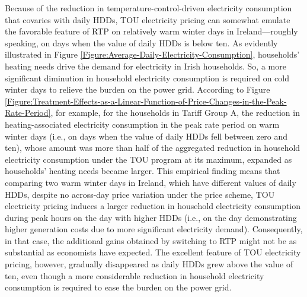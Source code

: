 Because of the reduction in temperature-control-driven electricity consumption that covaries with daily HDDs, TOU electricity pricing can somewhat emulate the favorable feature of RTP on relatively warm winter days in Ireland---roughly speaking, on days when the value of daily HDDs is below ten. As evidently illustrated in Figure \ref{Figure:Average-Daily-Electricity-Consumption}, households' heating needs drive the demand for electricity in Irish households. So, a more significant diminution in household electricity consumption is required on cold winter days to relieve the burden on the power grid. According to Figure \ref{Figure:Treatment-Effects-as-a-Linear-Function-of-Price-Changes-in-the-Peak-Rate-Period}, for example, for the households in Tariff Group A, the reduction in heating-associated electricity consumption in the peak rate period on warm winter days (i.e., on days when the value of daily HDDs fell between zero and ten), whose amount was more than half of the aggregated reduction in household electricity consumption under the TOU program at its maximum, expanded as households' heating needs became larger. This empirical finding means that comparing two warm winter days in Ireland, which have different values of daily HDDs, despite no across-day price variation under the price scheme, TOU electricity pricing induces a larger reduction in household electricity consumption during peak hours on the day with higher HDDs (i.e., on the day demonstrating higher generation costs due to more significant electricity demand). Consequently, in that case, the additional gains obtained by switching to RTP might not be as substantial as economists have expected. The excellent feature of TOU electricity pricing, however, gradually disappeared as daily HDDs grew above the value of ten, even though a more considerable reduction in household electricity consumption is required to ease the burden on the power grid. 
